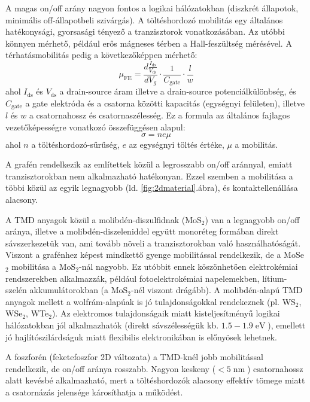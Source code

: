 \documentclass[twoside]{article}
\newcommand\abra[1]{\ref{#1}.ábra}
\DeclareMathOperator\nm{nm}
\DeclareMathOperator\eV{eV}
\begin{document}
A magas on/off arány nagyon fontos a logikai hálózatokban (diszkrét állapotok, minimális off-állapotbeli szivárgás). A töltéshordozó mobilitás egy általános hatékonysági, gyorsasági tényező a tranzisztorok vonatkozásában. Az utóbbi könnyen mérhető, például erős mágneses térben a Hall-feszültség mérésével. A térhatásmobilitás pedig a következőképpen mérhető:\cite{nichols2016}
\begin{equation}
	\mu_{\text{FE}} = \frac{d\frac{I_{\text{ds}}}{V_{\text{ds}}}}{dV_g}\cdot\frac{1}{C_{\text{gate}}}\cdot\frac{l}{w}
\end{equation}
ahol $I_\text{ds}$ és $V_\text{ds}$ a drain-source áram illetve a drain-source potenciálkülönbség, és $C_\text{gate}$ a gate elektróda és a csatorna közötti kapacitás (egységnyi felületen), illetve $l$ és $w$ a csatornahossz és csatornaszélesség. Ez a formula az általános fajlagos vezetőképességre vonatkozó összefüggésen alapul:
\begin{equation}
	\sigma = ne\mu
\end{equation}
ahol $n$ a töltéshordozó-sűrűség, $e$ az egységnyi töltés értéke, $\mu$ a mobilitás.  \par 
A grafén rendelkezik az említettek közül a legrosszabb on/off aránnyal, emiatt tranzisztorokban nem alkalmazható hatékonyan. Ezzel szemben a mobilitása a többi közül az egyik legnagyobb (ld. \abra{fig:2dmaterial}), és kontaktellenállása alacsony. \par 
A TMD anyagok közül a molibdén-diszulfidnak (MoS$_2$) van a legnagyobb on/off aránya, illetve a molibdén-diszeleniddel együtt monoréteg formában direkt sávszerkezetük van, ami tovább növeli a tranzisztorokban való használhatóságát. Viszont a grafénhez képest mindkettő gyenge mobilitással rendelkezik, de a MoSe$_2$ mobilitása a MoS$_2$-nál nagyobb\cite{eftekhari2017}. Ez utóbbit ennek köszönhetően elektrokémiai rendszerekben alkalmazzák, például fotoelektrokémiai napelemekben, lítium-szelén akkumulátorokban (a MoS$_2$-nél viszont drágább). A molibdén-alapú TMD anyagok mellett a wolfrám-alapúak is jó tulajdonságokkal rendekeznek (pl. WS$_2$, WSe$_2$, WTe$_2$). Az elektromos tulajdonságaik miatt kisteljesítményű logikai hálózatokban jól alkalmazhatók (direkt sávszélességük kb. $1.5-1.9\eV$), emellett jó hajlítószilárdságuk miatt flexibilis elektronikában is előnyösek lehetnek.\par 
A foszforén (feketefoszfor 2D változata) a TMD-knél jobb mobilitással rendelkezik, de on/off aránya rosszabb. Nagyon keskeny ($< 5\nm$) csatornahossz alatt kevésbé alkalmazható, mert a töltéshordozók alacsony effektív tömege miatt a csatornázás jelensége károsíthatja a működést.
\end{document}
